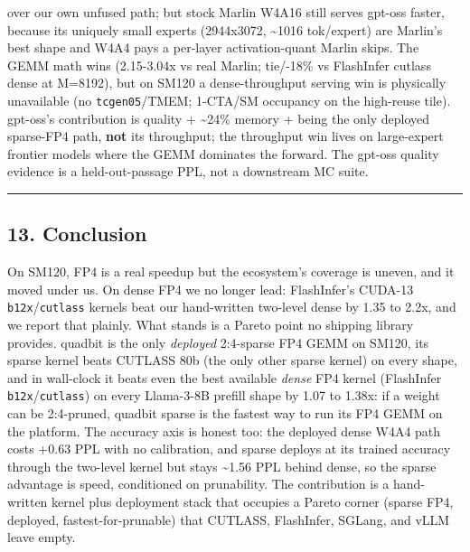 \documentclass[
]{article}
\begin{document}
\begin{itemize}
  over our own unfused path; but stock Marlin W4A16 still serves gpt-oss
  faster, because its uniquely small experts (2944x3072,
  \textasciitilde1016 tok/expert) are Marlin's best shape and W4A4 pays
  a per-layer activation-quant Marlin skips. The GEMM math wins
  (2.15-3.04x vs real Marlin; tie/-18\% vs FlashInfer cutlass dense at
  M=8192), but on SM120 a dense-throughput serving win is physically
  unavailable (no \texttt{tcgen05}/TMEM; 1-CTA/SM occupancy on the
  high-reuse tile). gpt-oss's contribution is quality +
  \textasciitilde24\% memory + being the only deployed sparse-FP4 path,
  \textbf{not} its throughput; the throughput win lives on large-expert
  frontier models where the GEMM dominates the forward. The gpt-oss
  quality evidence is a held-out-passage PPL, not a downstream MC suite.
\end{itemize}

\begin{center}\rule{0.5\linewidth}{0.5pt}\end{center}

\subsection{13. Conclusion}\label{conclusion}

On SM120, FP4 is a real speedup but the ecosystem's coverage is uneven,
and it moved under us. On dense FP4 we no longer lead: FlashInfer's
CUDA-13 \texttt{b12x}/\texttt{cutlass} kernels beat our hand-written
two-level dense by 1.35 to 2.2x, and we report that plainly. What stands
is a Pareto point no shipping library provides. quadbit is the only
\emph{deployed} 2:4-sparse FP4 GEMM on SM120, its sparse kernel beats
CUTLASS 80b (the only other sparse kernel) on every shape, and in
wall-clock it beats even the best available \emph{dense} FP4 kernel
(FlashInfer \texttt{b12x}/\texttt{cutlass}) on every Llama-3-8B prefill
shape by 1.07 to 1.38x: if a weight can be 2:4-pruned, quadbit sparse is
the fastest way to run its FP4 GEMM on the platform. The accuracy axis
is honest too: the deployed dense W4A4 path costs +0.63 PPL with no
calibration, and sparse deploys at its trained accuracy through the
two-level kernel but stays \textasciitilde1.56 PPL behind dense, so the
sparse advantage is speed, conditioned on prunability. The contribution
is a hand-written kernel plus deployment stack that occupies a Pareto
corner (sparse FP4, deployed, fastest-for-prunable) that CUTLASS,
FlashInfer, SGLang, and vLLM leave empty.
\end{document}

